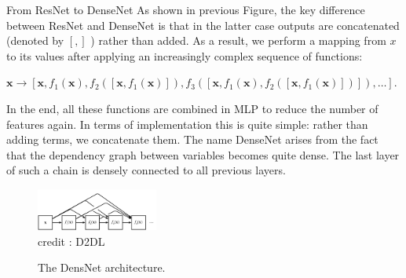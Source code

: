 \begin{vbframe}{From ResNet to DenseNet}
\small 
As shown in previous Figure, the key difference between ResNet and DenseNet is that in the latter case outputs are concatenated (denoted by  $[,]$ ) rather than added. As a result, we perform a mapping from  $x$  to its values after applying an increasingly complex sequence of functions:

\vspace{0.2cm}
$\mathbf{x} \to \left[ \mathbf{x}, f_1(\mathbf{x}), f_2([\mathbf{x}, f_1(\mathbf{x})]), f_3([\mathbf{x}, f_1(\mathbf{x}), f_2([\mathbf{x}, f_1(\mathbf{x})])]), \ldots\right].$

\vspace{0.2cm}
\small
In the end, all these functions are combined in MLP to reduce the number of features again. In terms of implementation this is quite simple: rather than adding terms, we concatenate them. 
\newline
The name DenseNet arises from the fact that the dependency graph between variables becomes quite dense. The last layer of such a chain is densely connected to all previous layers. 

\vspace{-0.4cm}
  \begin{figure}
    \centering
    \includegraphics[width=4cm]{plots/moderncnn/densenet.png}
    \tiny{\\ credit : D2DL}
    \caption{The DensNet architecture.}
  \end{figure}
  
 \end{vbframe}



